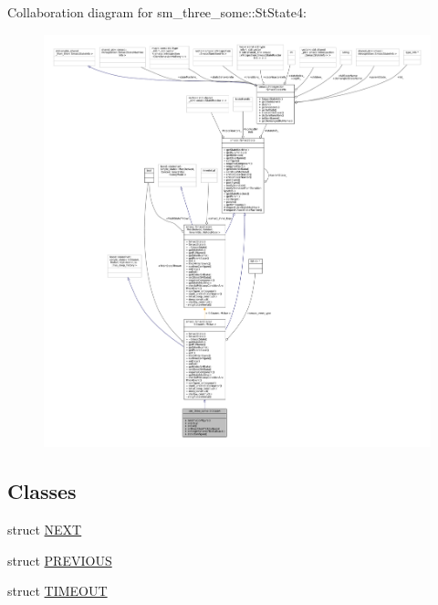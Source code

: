 Collaboration diagram for sm\+\_\+three\+\_\+some\+:\+:St\+State4\+:
\nopagebreak
\begin{figure}[H]
\begin{center}
\leavevmode
\includegraphics[width=350pt]{structsm__three__some_1_1StState4__coll__graph}
\end{center}
\end{figure}
\subsection*{Classes}
\begin{DoxyCompactItemize}
\item 
struct \hyperlink{structsm__three__some_1_1StState4_1_1NEXT}{N\+E\+XT}
\item 
struct \hyperlink{structsm__three__some_1_1StState4_1_1PREVIOUS}{P\+R\+E\+V\+I\+O\+US}
\item 
struct \hyperlink{structsm__three__some_1_1StState4_1_1TIMEOUT}{T\+I\+M\+E\+O\+UT}
\end{DoxyCompactItemize}
